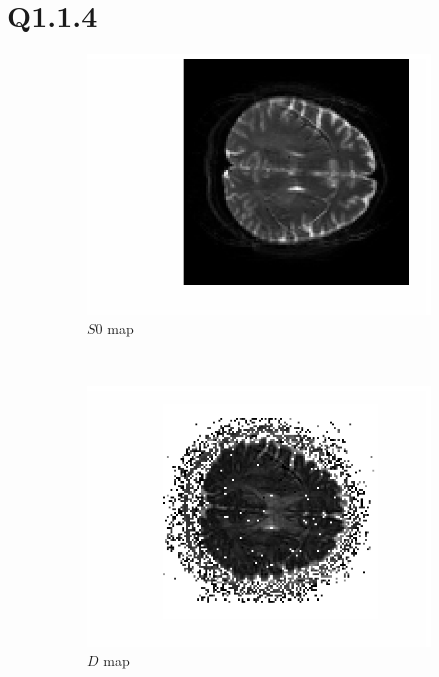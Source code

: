 \documentclass[11pt,a4paper,oneside]{report}
\begin{document}
\section*{Q1.1.4}

\begin{figure}[H]
  \centering
  \begin{subfigure}[b]{0.5\textwidth}
      \centering
    \includegraphics[scale=1]{figures/q1/q114-S0.eps}
    \caption{$S0$ map}
    \label{q114-S0}
  \end{subfigure}%
  ~
  \begin{subfigure}[b]{0.5\textwidth}
      \centering
    \includegraphics[scale=1]{figures/q1/q114-D.eps}
    \caption{$D$ map}
    \label{q114-D}
  \end{subfigure}%
  \caption{}

\end{figure}
\end{document}
